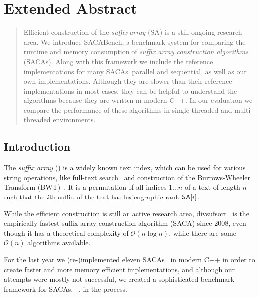 \chapter{Extended Abstract}


{
\newtheorem*{abstract}{Abstract}

\begin{abstract}
    Efficient construction of the \emph{suffix array} (SA) is a still ongoing research area.
    We introduce SACABench, a benchmark system for comparing the runtime
    and memory consumption of \emph{suffix array construction algorithms} (SACAs).
    Along with this framework we include the reference implementations for many SACAs,
    parallel and sequential, as well as our own implementations.
    Although they are slower than their reference implementations in most cases,
    they can be helpful to understand the algorithms because they are written in modern C++.
    In our evaluation we compare the performance of these algorithms
    in single-threaded and multi-threaded environments.
\end{abstract}
}

\section{Introduction}

The  \emph{suffix array} (\emph{\sa}) is a widely known text index,
which can be used for various string operations,
like full-text search~\cite{makinen} and construction of the Burrows-Wheeler Transform (BWT)~\cite{BWT}.
It is a permutation of all indices $1 \dots n$ of a text of length $n$ such
that the $i$th suffix of the text  has lexicographic rank $\sa[i]$.

While the efficient construction is still an active research area,
divsufsort~\cite{saca:5,saca:5:repo} is the empirically fastest
suffix array construction algorithm (SACA) since 2008,
even though it has a theoretical complexity of $\mathcal O (n \log n)$,
while there are some $\mathcal O(n)$ algorithms available.

For the last year we (re-)implemented eleven SACAs~\cite{saca:3,saca:11,saca:5,saca:9,saca:1,saca:8,saca:4,saca:7,saca:10,saca:6,saca:2}
in modern C++ in order to create faster and more memory efficient implementations,
and although our attempts were mostly not successful,
we created a sophisticated benchmark framework for SACAs, \emph{\sacabench}~\cite{sacabench:github}, in the process.

